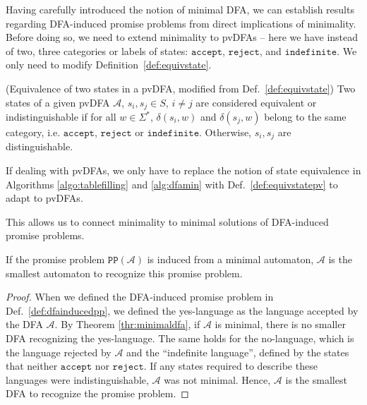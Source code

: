 \documentclass[../main.tex]{subfiles}
\begin{document}
Having carefully introduced the notion of minimal \ac{DFA}, we can establish results regarding DFA-induced promise problems from direct implications of minimality. Before doing so, we need to extend minimality to \acp{pvDFA} -- here we have instead of two, three categories or labels of states: $\mathtt{accept}$, $\mathtt{reject}$, and $\mathtt{indefinite}$. We only need to modify Definition~\ref{def:equivstate}.

\begin{definition}
    \label{def:equivstatepv}
    (Equivalence of two states in a pvDFA, modified from Def.~\ref{def:equivstate}) Two states of a given \ac{pvDFA} $\mathcal{A}$, $s_i,s_j\in S$, $i \neq j$ are considered equivalent or indistinguishable if for all $w \in \Sigma^*$, $\delta(s_i,w)$ and $\delta(s_j,w)$ belong to the same category, i.e. $\mathtt{accept}$, $\mathtt{reject}$  or $\mathtt{indefinite}$. Otherwise,  $s_i,s_j$ are distinguishable.
\end{definition}

If dealing with \acp{pvDFA}, we only have to replace the notion of state equivalence in Algorithms \ref{algo:tablefilling} and \ref{alg:dfamin} with Def.~\ref{def:equivstatepv} to adapt to \acp{pvDFA}. 

This allows us to connect minimality to minimal solutions of DFA-induced promise problems.

\begin{proposition}
    If the promise problem $\mathtt{PP}(\mathcal{A})$ is induced from a minimal automaton, $\mathcal{A}$ is the smallest automaton to recognize this promise problem.
\end{proposition}

\begin{proof}
    When we defined the \ac{DFA}-induced promise problem in Def.~\ref{def:dfainducedpp}, we defined the yes-language as the language accepted by the \ac{DFA} $\mathcal{A}$. By Theorem \ref{thr:minimaldfa}, if $\mathcal{A}$ is minimal, there is no smaller \ac{DFA} recognizing the yes-language. The same holds for the no-language, which is the language rejected by $\mathcal{A}$ and the ``indefinite language'', defined by the states that neither $\mathtt{accept}$ nor $\mathtt{reject}$. If any states required to describe these languages were indistinguishable, $\mathcal{A}$ was not minimal. Hence, $\mathcal{A}$ is the smallest \ac{DFA} to recognize the promise problem.
\end{proof}
\end{document}
